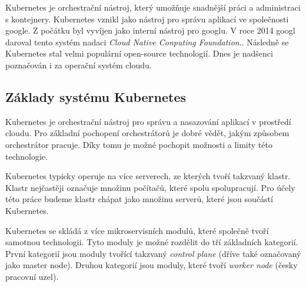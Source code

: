 \bigskip\medskip
Kubernetes je orchestrační nástroj, který umožňuje snadnější práci a administraci s kontejnery. Kubernetes vznikl jako nástroj pro správu aplikací ve společnosti google. Z počátku byl vyvíjen jako interní nástroj pro googlu. V roce 2014 googl daroval tento systém nadaci \textit{Cloud Native Conputing Foundation}.\cite{poulton_2022_the}. Následně se Kubernetes stal velmi populární open-source technologií. Dnes je nadšenci poznačován i za operační systém cloudu.\cite{poulton_2022_the}%


\subsection{Základy systému Kubernetes}

Kubernetes je orchestrační nástroj pro správu a nasazování aplikací v prostředí cloudu. Pro základní pochopení orchestrátorů je dobré vědět, jakým způsobem orchestrátor pracuje. Díky tomu je možné pochopit možnosti a limity této technologie.

Kubernetes typicky operuje na více serverech, ze kterých tvoří takzvaný klastr. Klastr nejčastěji označuje množinu počítačů, které spolu spolupracují. Pro účely této práce budeme klastr chápat jako množinu serverů, které jsou součástí Kubernetes.

Kubernetes se skládá z více mikroservisních modulů, které společně tvoří samotnou technologii. Tyto moduly je možné rozdělit do tří základních kategorií. První kategorií jsou moduly tvořící takzvaný \textit{control plane} (dříve také označovaný jako master node). Druhou kategorií jsou moduly, které tvoří \textit{worker node} (česky pracovní uzel).


